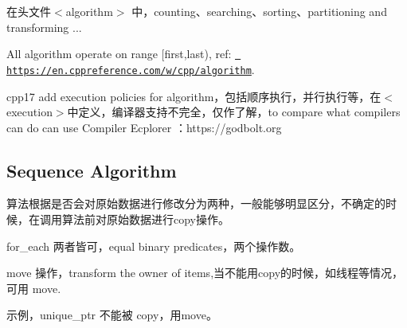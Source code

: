 在头文件$<$algorithm$>$ 中，counting、searching、sorting、partitioning and transforming ...

All algorithm operate on range \mbox{[}first,last), ref\+: \href{https://en.cppreference.com/w/cpp/algorithm}{\texttt{ https\+://en.\+cppreference.\+com/w/cpp/algorithm}}.

cpp17 add execution policies for algorithm，包括顺序执行，并行执行等，在$<$execution$>$中定义，编译器支持不完全，仅作了解，to compare what compilers can do can use Compiler Ecplorer ：https\+://godbolt.org

\subsection*{Sequence Algorithm}

算法根据是否会对原始数据进行修改分为两种，一般能够明显区分，不确定的时候，在调用算法前对原始数据进行copy操作。

for\+\_\+each 两者皆可，equal binary predicates，两个操作数。

move 操作，transform the owner of items,当不能用copy的时候，如线程等情况，可用 move.

示例，unique\+\_\+ptr 不能被 copy，用move。 